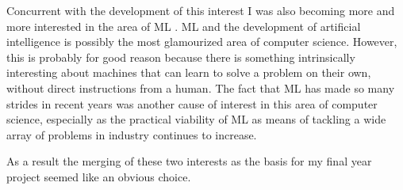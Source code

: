Concurrent with the development of this interest I was also becoming more and more interested in the area
of ML .
ML and the development of artificial intelligence is possibly the most glamourized area
of computer science.
However, this is probably for good reason because there is something intrinsically interesting
about machines that can learn to solve a problem on their own, without direct instructions from a human.
The fact that ML has made so many strides in recent years was another cause of interest in
this area of computer science, especially as the practical viability of ML as means of tackling a wide array
of problems in industry continues to increase.

As a result the merging of these two interests as the basis for my final year project seemed like an obvious choice.